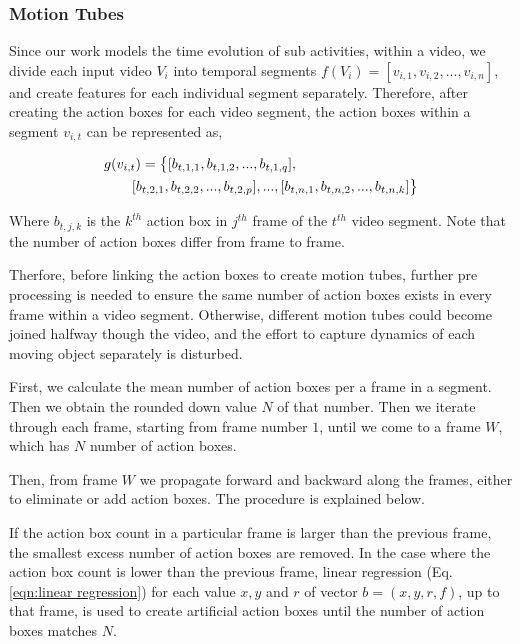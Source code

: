\subsubsection{Motion Tubes}
Since our work models the time evolution of sub activities, within a video, we divide each input video $V_{i}$ into temporal segments $f(V_{i}) = [v_{i,1},
v_{i,2}, ..., v_{i,n}]$,
and create features for each individual segment separately. Therefore, after creating the action boxes for each video segment,
the action boxes within a segment $v_{i,t}$ can be represented as,

\begin{equation}
\label{eqn:action box}
\begin{split}
\MoveEqLeft
 g(v_{i,t}) = \big\{[b_{t,1,1},b_{t,1,2},...,b_{t,1,q}],\\
 & [b_{t,2,1},b_{t,2,2},...,b_{t,2,p}],...,[b_{t,n,1},b_{t,n,2},...,b_{t,n,k}]\big\}
\end{split}
\end{equation}

Where $b_{t,j,k}$ is the $k^{th}$ action box in $j^{th}$ frame of the $t^{th}$ video segment. Note that the number of
action boxes differ from frame to frame.

Therfore, before linking the action boxes to create motion tubes, further pre processing is needed to ensure the same number of action
boxes exists in every frame within a video segment. Otherwise, different motion tubes could become joined halfway though the video, and the
effort to capture dynamics of each moving object separately is disturbed.

First, we calculate the mean number of action boxes per a frame in a segment. Then we obtain the rounded down value $N$ of that number.
Then we iterate through each frame, starting from frame number $1$, until we come to a frame $W$, which has $N$ number of action boxes.

Then, from frame $W$ we propagate forward and backward along the frames, either to eliminate or add action boxes. The procedure is explained
below.

If the action box count in a particular frame is larger than the previous frame, the smallest excess number of action boxes are removed.
In the case where the action box count is lower than the previous frame, linear regression (Eq. \ref{eqn:linear regression}) for each value $x,y$ and $r$ of vector $b = (x,y,r,f)$,
up to that frame, is used to create artificial action boxes until the number of action boxes matches $N$.

